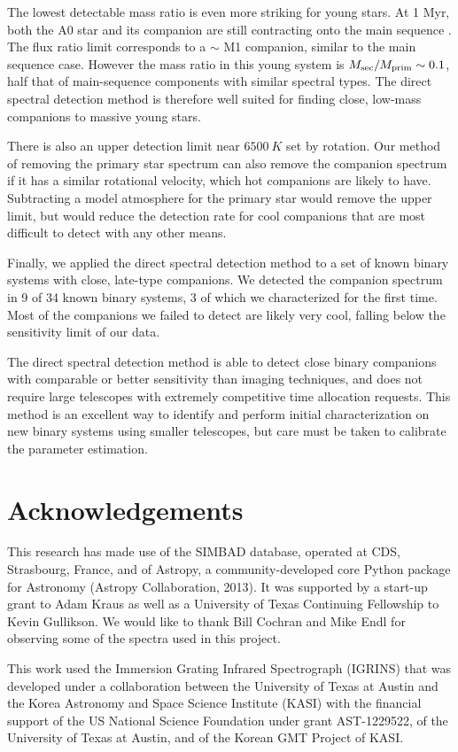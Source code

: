 \documentclass{emulateapj}
\begin{document}
The lowest detectable mass ratio is even more striking for young stars. At 1 Myr, both the A0 star and its companion are still contracting onto the main sequence \citep{Bressan2012}. The flux ratio limit corresponds to a $\sim$ M1 companion, similar to the main sequence case. However the mass ratio in this young system is $M_{\rm  sec}/M_{\rm prim} \sim 0.1$, half that of main-sequence components with similar spectral types. The direct spectral detection method is therefore well suited for finding close, low-mass companions to massive young stars.

There is also an upper detection limit near $6500\ K$ set by rotation. Our method of removing the primary star spectrum can also remove the companion spectrum if it has a similar rotational velocity, which hot companions are likely to have. Subtracting a model atmosphere for the primary star would remove the upper limit, but would reduce the detection rate for cool companions that are most difficult to detect with any other means.

Finally, we applied the direct spectral detection method to a set of known binary systems with close, late-type companions. We detected the companion spectrum in 9 of 34 known binary systems, 3 of which we characterized for the first time. Most of the companions we failed to detect are likely very cool, falling below the sensitivity limit of our data.

The direct spectral detection method is able to detect close binary companions with comparable or better sensitivity than imaging techniques, and does not require large telescopes with extremely competitive time allocation requests. This method is an excellent way to identify and perform initial characterization on new binary systems using smaller telescopes, but care must be taken to calibrate the parameter estimation. 

\section*{Acknowledgements}
This research has made use of the SIMBAD database, operated at CDS, Strasbourg, France, and of Astropy, a community-developed core Python package for Astronomy (Astropy Collaboration, 2013).
It was supported by a start-up grant to Adam Kraus as well as a University of Texas Continuing Fellowship to Kevin Gullikson. We would like to thank Bill Cochran and Mike Endl for observing some of the spectra used in this project. 

This work used the Immersion Grating Infrared Spectrograph (IGRINS) that was developed under a collaboration between the University of Texas at Austin and the Korea Astronomy and Space Science Institute (KASI) with the financial support of the US National Science Foundation under grant AST-1229522, of the University of Texas at Austin, and of the Korean GMT Project of KASI.
\end{document}

